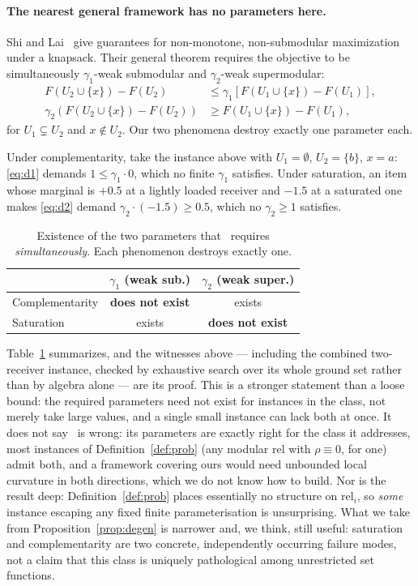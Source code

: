 \documentclass[sigconf,anonymous]{aamas}
\theoremstyle{remark}
\begin{document}
\paragraph{The nearest general framework has no parameters here.}
Shi and Lai~\cite{shilai2024} give guarantees for non-monotone,
non-submodular maximization under a knapsack. Their general theorem
requires the objective to be simultaneously $\gamma_1$-weak submodular
and $\gamma_2$-weak supermodular:
\begin{align}
F(U_2 \cup \{x\}) - F(U_2) &\le \gamma_1\left[F(U_1 \cup \{x\}) - F(U_1)\right],
\label{eq:d1}\\
\gamma_2\left(F(U_2 \cup \{x\}) - F(U_2)\right) &\ge F(U_1 \cup \{x\}) - F(U_1),
\label{eq:d2}
\end{align}
for $U_1 \subsetneq U_2$ and $x \notin U_2$. Our two phenomena destroy
exactly one parameter each.

Under complementarity, take the instance above with $U_1 = \emptyset$,
$U_2 = \{b\}$, $x = a$: \eqref{eq:d1} demands $1 \le \gamma_1 \cdot 0$,
which no finite $\gamma_1$ satisfies. Under saturation, an item whose
marginal is $+0.5$ at a lightly loaded receiver and $-1.5$ at a
saturated one makes \eqref{eq:d2} demand
$\gamma_2 \cdot (-1.5) \ge 0.5$, which no $\gamma_2 \ge 1$ satisfies.

\begin{table}[t]
\centering
\caption{Existence of the two parameters that~\cite{shilai2024}
requires \emph{simultaneously}. Each phenomenon destroys exactly one.}
\label{tab:degen}
\begin{tabular}{lcc}
\toprule
 & $\gamma_1$ (weak sub.) & $\gamma_2$ (weak super.) \\
\midrule
Complementarity & \textbf{does not exist} & exists \\
Saturation      & exists & \textbf{does not exist} \\
\bottomrule
\end{tabular}
\end{table}

Table~\ref{tab:degen} summarizes, and the witnesses above --- including
the combined two-receiver instance, checked by exhaustive search over
its whole ground set rather than by algebra alone --- are its proof.
This is a stronger statement than a loose bound: the required
parameters need not exist for instances in the class, not merely take
large values, and a single small instance can lack both at once. It
does not say~\cite{shilai2024} is wrong: its parameters are exactly
right for the class it addresses, most instances of
Definition~\ref{def:prob} (any modular $\mathrm{rel}$ with
$\rho\equiv0$, for one) admit both, and a framework covering ours would
need unbounded local curvature in both directions, which we do not
know how to build. Nor is the result deep: Definition~\ref{def:prob}
places essentially no structure on $\mathrm{rel}_i$, so \emph{some}
instance escaping any fixed finite parameterisation is unsurprising.
What we take from Proposition~\ref{prop:degen} is narrower and, we
think, still useful: saturation and complementarity are two concrete,
independently occurring failure modes, not a claim that this class is
uniquely pathological among unrestricted set functions.
\end{document}
